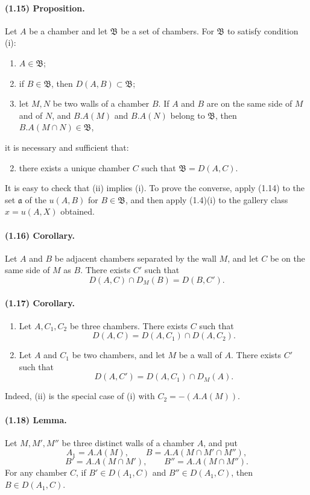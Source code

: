\documentclass[10pt]{article}
\begin{document}
\paragraph{(1.15) Proposition.} Let $A$ be a chamber and let $\mathfrak B$ be a set of chambers. For $\mathfrak B$ to satisfy condition (i):
\begin{enumerate}[label=(i\alph*)]
\item $A\in\mathfrak B$;
\item if $B\in\mathfrak B$, then $D(A,B)\subset\mathfrak B$;
\item let $M,N$ be two walls of a chamber $B$. If $A$ and $B$ are on the same side of $M$ and of $N$, and $B.A(M)$ and $B.A(N)$ belong to $\mathfrak B$, then $B.A(M\cap N)\in\mathfrak B$,
\end{enumerate}
it is necessary and sufficient that:
\begin{enumerate}[label=(\roman*)]
\setcounter{enumi}{1}
\item there exists a unique chamber $C$ such that $\mathfrak B=D(A,C)$.
\end{enumerate}
It is easy to check that (ii) implies (i). To prove the converse, apply (1.14) to the set $\mathfrak a$ of the $u(A,B)$ for $B\in\mathfrak B$, and then apply (1.4)(i) to the gallery class $x=u(A,X)$ obtained.

\paragraph{(1.16) Corollary.} Let $A$ and $B$ be adjacent chambers separated by the wall $M$, and let $C$ be on the same side of $M$ as $B$. There exists $C'$ such that
\[
D(A,C)\cap D_M(B)=D(B,C').
\]

\paragraph{(1.17) Corollary.} \begin{enumerate}[label=(\roman*)]
\item Let $A,C_1,C_2$ be three chambers. There exists $C$ such that
\[
\tag{1.17.1}
D(A,C)=D(A,C_1)\cap D(A,C_2).
\]
\item Let $A$ and $C_1$ be two chambers, and let $M$ be a wall of $A$. There exists $C'$ such that
\[
\tag{1.17.2}
D(A,C')=D(A,C_1)\cap D_M(A).
\]
\end{enumerate}
Indeed, (ii) is the special case of (i) with $C_2=-(A.A(M))$.

\paragraph{(1.18) Lemma.} Let $M,M',M''$ be three distinct walls of a chamber $A$, and put
\[
A_1=A.A(M),\qquad B=A.A(M\cap M'\cap M''),
\]
\[
B'=A.A(M\cap M'),\qquad B''=A.A(M\cap M'').
\]
For any chamber $C$, if $B'\in D(A_1,C)$ and $B''\in D(A_1,C)$, then $B\in D(A_1,C)$.
\end{document}

